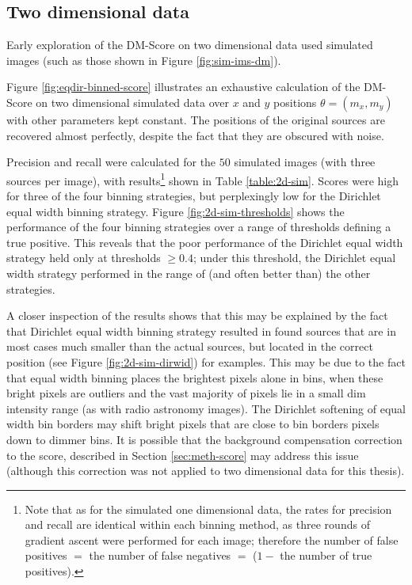 \subsection{Two dimensional data}

Early exploration of the DM-Score on two dimensional data used simulated images (such as those shown in Figure \ref{fig:sim-ims-dm}). 

Figure \ref{fig:eqdir-binned-score} illustrates an exhaustive calculation of the DM-Score on two dimensional simulated data over $x$ and $y$ positions $\theta = (m_x, m_y)$ with other parameters kept constant. The positions of the original sources are recovered almost perfectly, despite the fact that they are obscured with noise.

Precision and recall were calculated for the $50$ simulated images (with three sources per image), with results\footnote{Note that as for the simulated one dimensional data, the rates for precision and recall are identical within each binning method, as three rounds of gradient ascent were performed for each image; therefore the number of false positives $=$ the number of false negatives $=$ ($1-$ the number of true positives).} shown in Table \ref{table:2d-sim}. Scores were high for three of the four binning strategies, but perplexingly low for the Dirichlet equal width binning strategy. Figure \ref{fig:2d-sim-thresholds} shows the performance of the four binning strategies over a range of thresholds defining a true positive. This reveals that the poor performance of the Dirichlet equal width strategy held only at thresholds $\ge 0.4$; under this threshold, the Dirichlet equal width strategy performed in the range of (and often better than) the other strategies. 

A closer inspection of the results shows that this may be explained by the fact that Dirichlet equal width binning strategy resulted in found sources that are in most cases much smaller than the actual sources, but located in the correct position (see Figure \ref{fig:2d-sim-dirwid}) for examples. This may be due to the fact that equal width binning places the brightest pixels alone in bins, when these bright pixels are outliers and the vast majority of pixels lie in a small dim intensity range (as with radio astronomy images). The Dirichlet softening of equal width bin borders may shift bright pixels that are close to bin borders pixels down to dimmer bins. It is possible that the background compensation correction to the score, described in Section \ref{sec:meth-score} may address this issue (although this correction was not applied to two dimensional data for this thesis). 

